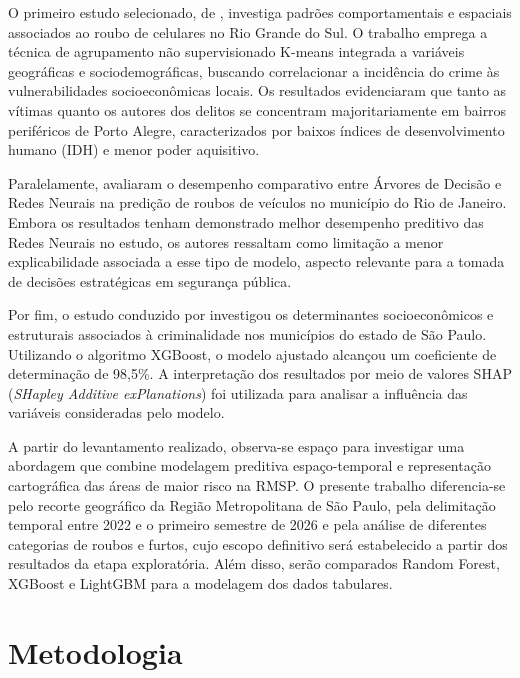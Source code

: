 \documentclass[12pt]{article}
\begin{document}
O primeiro estudo selecionado, de \cite{couto2024identificaccao}, investiga padrões comportamentais e espaciais associados ao roubo de celulares no Rio Grande do Sul. O trabalho emprega a técnica de agrupamento não supervisionado K-means integrada a variáveis geográficas e sociodemográficas, buscando correlacionar a incidência do crime às vulnerabilidades socioeconômicas locais. Os resultados evidenciaram que tanto as vítimas quanto os autores dos delitos se concentram majoritariamente em bairros periféricos de Porto Alegre, caracterizados por baixos índices de desenvolvimento humano (IDH) e menor poder aquisitivo.

Paralelamente, \cite{de2025previsao} avaliaram o desempenho comparativo entre Árvores de Decisão e Redes Neurais na predição de roubos de veículos no município do Rio de Janeiro. Embora os resultados tenham demonstrado melhor desempenho preditivo das Redes Neurais no estudo, os autores ressaltam como limitação a menor explicabilidade associada a esse tipo de modelo, aspecto relevante para a tomada de decisões estratégicas em segurança pública.

Por fim, o estudo conduzido por \cite{fernandes2025aplicaccao} investigou os determinantes socioeconômicos e estruturais associados à criminalidade nos municípios do estado de São Paulo. Utilizando o algoritmo XGBoost, o modelo ajustado alcançou um coeficiente de determinação de 98,5\%. A interpretação dos resultados por meio de valores SHAP (\textit{SHapley Additive exPlanations}) foi utilizada para analisar a influência das variáveis consideradas pelo modelo.

A partir do levantamento realizado, observa-se espaço para investigar uma abordagem que combine modelagem preditiva espaço-temporal e representação cartográfica das áreas de maior risco na RMSP. O presente trabalho diferencia-se pelo recorte geográfico da Região Metropolitana de São Paulo, pela delimitação temporal entre 2022 e o primeiro semestre de 2026 e pela análise de diferentes categorias de roubos e furtos, cujo escopo definitivo será estabelecido a partir dos resultados da etapa exploratória. Além disso, serão comparados Random Forest, XGBoost e LightGBM para a modelagem dos dados tabulares.

\vspace{1.2cm}

\section{Metodologia}
\end{document}
